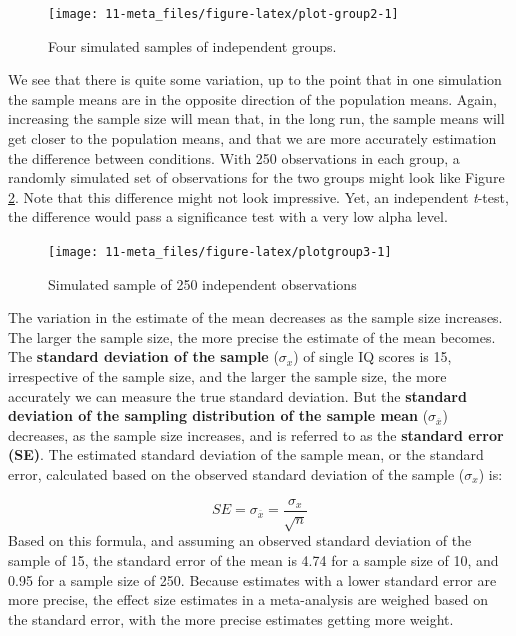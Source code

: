 \documentclass[
  oneside]{book}
\begin{document}
\begin{figure}

{\centering \texttt{[image: 11-meta\_files/figure-latex/plot-group2-1]} 

}

\caption{Four simulated samples of independent groups.}\label{fig:plot-group2}
\end{figure}

We see that there is quite some variation, up to the point that in one simulation the sample means are in the opposite direction of the population means. Again, increasing the sample size will mean that, in the long run, the sample means will get closer to the population means, and that we are more accurately estimation the difference between conditions. With 250 observations in each group, a randomly simulated set of observations for the two groups might look like Figure \ref{fig:plotgroup3}. Note that this difference might not look impressive. Yet, an independent \emph{t}-test, the difference would pass a significance test with a very low alpha level.

\begin{figure}

{\centering \texttt{[image: 11-meta\_files/figure-latex/plotgroup3-1]} 

}

\caption{Simulated sample of 250 independent observations}\label{fig:plotgroup3}
\end{figure}

The variation in the estimate of the mean decreases as the sample size increases. The larger the sample size, the more precise the estimate of the mean becomes. The \textbf{standard deviation of the sample} (\(\sigma_x\)) of single IQ scores is 15, irrespective of the sample size, and the larger the sample size, the more accurately we can measure the true standard deviation. But the \textbf{standard deviation of the sampling distribution of the sample mean} (\(\sigma_{\overline{x}}\)) decreases, as the sample size increases, and is referred to as the \textbf{standard error (SE)}. The estimated standard deviation of the sample mean, or the standard error, calculated based on the observed standard deviation of the sample (\(\sigma_x\)) is:

\[SE = \sigma_{\overline{x}} =  \frac{\sigma_x}{\sqrt{n}}\]
Based on this formula, and assuming an observed standard deviation of the sample of 15, the standard error of the mean is 4.74 for a sample size of 10, and 0.95 for a sample size of 250. Because estimates with a lower standard error are more precise, the effect size estimates in a meta-analysis are weighed based on the standard error, with the more precise estimates getting more weight.
\end{document}
